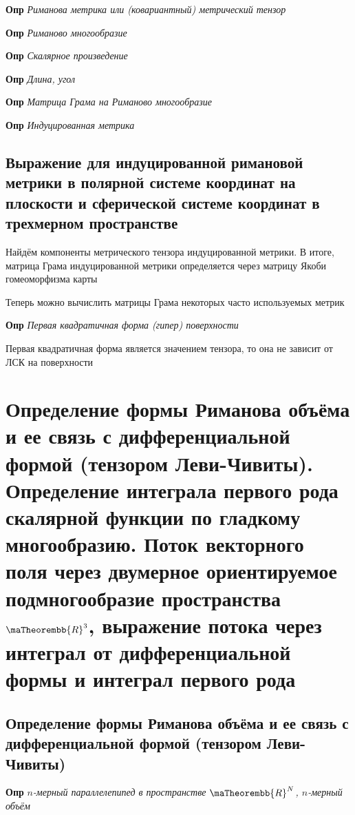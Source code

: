\documentclass[a4paper, 14pt]{article}
\begin{document}
    \textbf{Опр} \textit{Риманова метрика или (ковариантный) метрический тензор}
    
    \textbf{Опр} \textit{Риманово многообразие}
    
    \textbf{Опр} \textit{Скалярное произведение}
    
    \textbf{Опр} \textit{Длина, угол}
    
    \textbf{Опр} \textit{Матрица Грама на Риманово многообразие}
    
    \textbf{Опр} \textit{Индуцированная метрика}
    
    \subsection{Выражение для индуцированной римановой метрики в полярной системе координат на плоскости и
    сферической системе координат в трехмерном пространстве}
    
    Найдём компоненты метрического тензора индуцированной метрики.
    В итоге, матрица Грама индуцированной метрики определяется через матрицу Якоби гомеоморфизма карты
    
    Теперь можно вычислить матрицы Грама некоторых часто используемых метрик
    
    \textbf{Опр} \textit{Первая квадратичная форма (гипер) поверхности}
    
    Первая квадратичная форма является значением тензора, то она не зависит от ЛСК на поверхности
    
    \section{Определение формы Риманова объёма и ее связь с дифференциальной формой (тензором Леви-Чивиты).
    Определение интеграла первого рода скалярной функции по гладкому многообразию.
    Поток векторного поля через двумерное ориентируемое подмногообразие пространства $\maTheorembb{R}^3$, выражение
    потока через интеграл от дифференциальной формы и интеграл первого рода}
    
    \subsection{Определение формы Риманова объёма и ее связь с дифференциальной формой (тензором Леви-Чивиты)}
    
    \textbf{Опр} \textit{$n$-мерный параллелепипед в пространстве $\maTheorembb{R}^N$, $n$-мерный объём}
    
\end{document}
